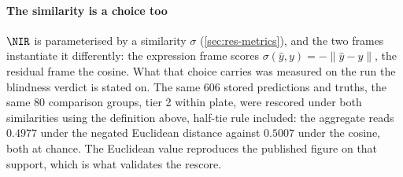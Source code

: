 \paragraph{The similarity is a choice too} $\NIR$ is parameterised by a
similarity $\sigma$ (\cref{sec:res-metrics}), and the two frames instantiate it
differently: the expression frame scores $\sigma(\hat y, y) = -\lVert \hat y - y
\rVert$, the residual frame the cosine. What that choice carries was measured on
the run the blindness verdict is stated on. The same $606$ stored predictions
and truths, the same $80$ comparison groups, tier 2 within plate, were rescored
under both similarities using the definition above, half-tie rule included: the
aggregate reads $0.4977$ under the negated Euclidean distance against $0.5007$
under the cosine, both at chance. The Euclidean value reproduces the published
figure on that support, which is what validates the rescore.

